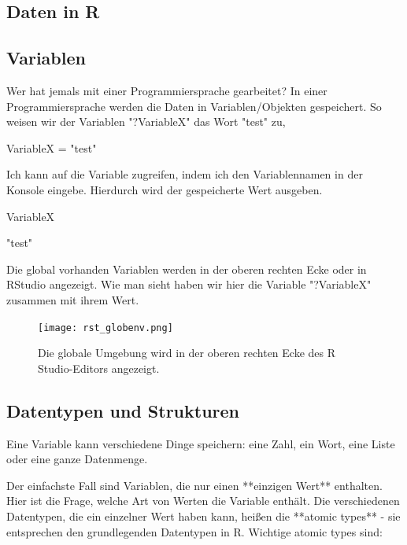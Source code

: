 \documentclass[a4paper,twoside]{tufte-book}\usepackage[]{graphicx}\usepackage[]{color}
\begin{document}
\begin{appendices}
\section{Daten in R}\label{HandlingDataInR}

\subsection{Variablen}

Wer hat jemals mit einer Programmiersprache gearbeitet? In einer Programmiersprache werden die Daten in Variablen/Objekten gespeichert. So weisen wir der Variablen "?VariableX" das Wort "test" zu,

\begin{Schunk}
\begin{Sinput}
VariableX = "test"
\end{Sinput}
\end{Schunk}

Ich kann auf die Variable zugreifen, indem ich den Variablennamen in der Konsole eingebe. Hierdurch wird der gespeicherte Wert ausgeben.

\begin{Schunk}
\begin{Sinput}
VariableX
\end{Sinput}
\begin{Soutput}
[1] "test"
\end{Soutput}
\end{Schunk}

Die global vorhanden Variablen werden in der oberen rechten Ecke oder in RStudio angezeigt. Wie man sieht haben wir hier die Variable "?VariableX" zusammen mit ihrem Wert.


\begin{figure}[]
\begin{center}
\texttt{[image: rst\_globenv.png]}
\caption{Die globale Umgebung wird in der oberen rechten Ecke des R Studio-Editors angezeigt.}
\label{fig: Rstudio}
\end{center}
\end{figure}

\subsection{Datentypen und Strukturen}

Eine Variable kann verschiedene Dinge speichern: eine Zahl, ein Wort, eine Liste oder eine ganze Datenmenge.

Der einfachste Fall sind Variablen, die nur einen **einzigen Wert** enthalten. Hier ist die Frage, welche Art von Werten die Variable enthält. Die verschiedenen Datentypen, die ein einzelner Wert haben kann, heißen die **atomic types** - sie entsprechen den grundlegenden Datentypen in R. Wichtige atomic types sind:


\end{appendices}
\end{document}
